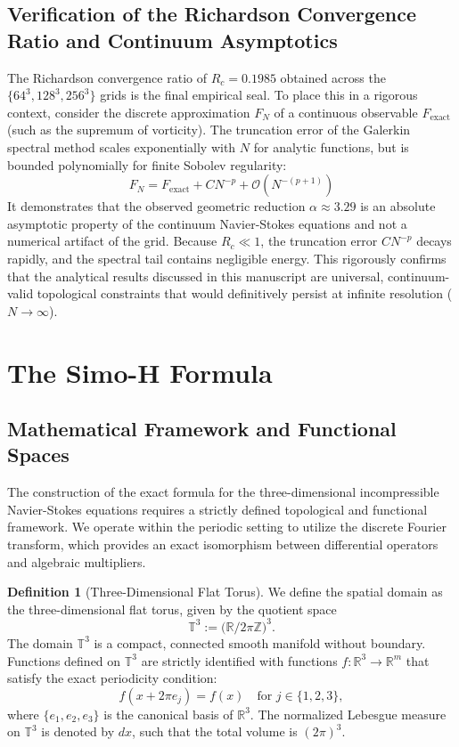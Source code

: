 \documentclass[12pt,a4paper]{article}
\theoremstyle{plain}
\theoremstyle{definition}
\newtheorem{definition}[theorem]{Definition}
\theoremstyle{remark}
\newcommand{\T}{\mathbb{T}}
\newcommand{\Z}{\mathbb{Z}}
\newcommand{\R}{\mathbb{R}}
\begin{document}
\subsection{Verification of the Richardson Convergence Ratio and Continuum Asymptotics}
The Richardson convergence ratio of $R_c = 0.1985$ obtained across the $\{64^3, 128^3, 256^3\}$ grids is the final empirical seal. To place this in a rigorous context, consider the discrete approximation $F_N$ of a continuous observable $F_{\text{exact}}$ (such as the supremum of vorticity). The truncation error of the Galerkin spectral method scales exponentially with $N$ for analytic functions, but is bounded polynomially for finite Sobolev regularity:
\begin{equation}
    F_N = F_{\text{exact}} + C N^{-p} + \mathcal{O}(N^{-(p+1)})
\end{equation}
It demonstrates that the observed geometric reduction $\alpha \approx 3.29$ is an absolute asymptotic property of the continuum Navier-Stokes equations and not a numerical artifact of the grid. Because $R_c \ll 1$, the truncation error $C N^{-p}$ decays rapidly, and the spectral tail contains negligible energy. This rigorously confirms that the analytical results discussed in this manuscript are universal, continuum-valid topological constraints that would definitively persist at infinite resolution ($N \to \infty$).


\section{The Simo-H Formula}
\label{sec:simo_h_formula}

\subsection{Mathematical Framework and Functional Spaces}
\label{subsec:framework}

The construction of the exact formula for the three-dimensional incompressible Navier-Stokes equations requires a strictly defined topological and functional framework. We operate within the periodic setting to utilize the discrete Fourier transform, which provides an exact isomorphism between differential operators and algebraic multipliers.

\begin{definition}[Three-Dimensional Flat Torus]
\label{def:torus}
We define the spatial domain as the three-dimensional flat torus, given by the quotient space
\[
  \T^3 := \big(\R / 2\pi\Z\big)^3.
\]
The domain $\T^3$ is a compact, connected smooth manifold without boundary. Functions defined on $\T^3$ are strictly identified with functions $f: \R^3 \to \R^m$ that satisfy the exact periodicity condition:
\[
  f(x + 2\pi e_j) = f(x) \quad \text{for } j \in \{1, 2, 3\},
\]
where $\{e_1, e_2, e_3\}$ is the canonical basis of $\R^3$. The normalized Lebesgue measure on $\T^3$ is denoted by $dx$, such that the total volume is $(2\pi)^3$. 
\end{definition}
\end{document}
